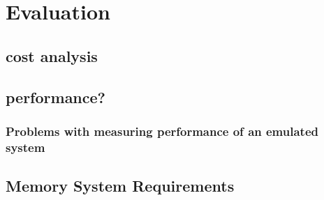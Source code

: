 \chapter{Evaluation}

\label{chap:eval}

\section{cost analysis}
\section{performance?}
\subsection{Problems with measuring performance of an emulated system}

\section{Memory System Requirements}
\cite{jacobSoftwaremanagedAddressTranslation1997}

